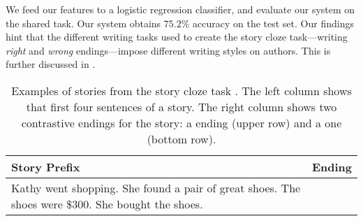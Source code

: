 \documentclass[11pt]{article}
\begin{document}
We feed our features to  a logistic regression classifier, and evaluate our system on the shared task.
Our system obtains $75.2\%$ accuracy on the test set.
Our findings hint that the different writing tasks used to create the story cloze task---writing {\it right} and {\it wrong} endings---impose different writing styles on authors. 
This is further discussed in .

\begin{table}[!t]
\begin{tabular}{|p{3.5cm}|p{3.5cm}|} \hline
{\bf Story Prefix} & {\bf Ending} \\ \hline
\multirow{2}{*}{\parbox[b][7.5em][c]{3.5cm}{Kathy went shopping. She found a pair of great shoes. The shoes were \$300. She bought the shoes.}}	&{\color{blue}{She felt buyer's remorse after the purchase.}} \\ \cline{2-2}
& {\color{red}{Kathy hated buying shoes.}} \\ \hline
\end{tabular}
\caption{\label{ROC-example}
Examples of stories from the story cloze task \cite{Mostafazadeh:2016}. 
The left column shows that first four sentences of a story. 
The right column shows two contrastive endings for the story:
 a {\color{blue}{coherent}} ending (upper row) and a {\color{red}{incoherent}} one (bottom row).
}
\end{table}
\end{document}
